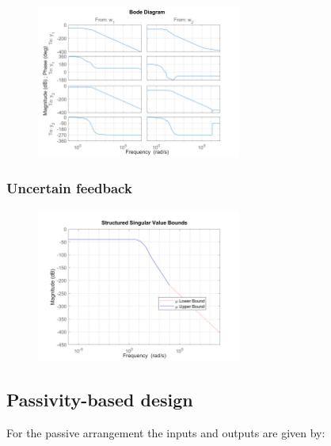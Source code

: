 \documentclass{article}
\begin{document}
\begin{figure}[H]
    \centering
    \includegraphics[width=0.6\textwidth]{figures/K_g_bode.png}
    \caption{}
\end{figure}

\subsubsection{Uncertain feedback}

\begin{figure}[H]
    \centering
    \includegraphics[width=0.6\textwidth]{figures/structured_singular_values.png}
    \caption{}
\end{figure}

\subsection{Passivity-based design}

For the passive arrangement the inputs and outputs are given by:
\end{document}
